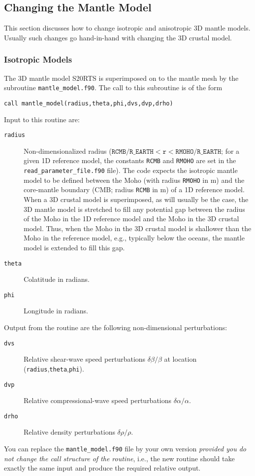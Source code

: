 \documentclass[onecolumn]{article}
\begin{document}
\subsection{Changing the Mantle Model}

This section discusses how to change isotropic and anisotropic
3D mantle models. Usually such changes go hand-in-hand with
changing the 3D crustal model.

\subsubsection{Isotropic Models}

The 3D mantle model S20RTS \cite{RiVaWo99} is superimposed on to
the mantle mesh by the subroutine \texttt{mantle\_model.f90}.
The call to this subroutine is of the form
\begin{verbatim}
call mantle_model(radius,theta,phi,dvs,dvp,drho)
\end{verbatim}
Input to this routine are:
\begin{description}
\item[\texttt{radius}] Non-dimensionalized radius
($\texttt{RCMB/R\_EARTH}<\texttt{r}<\texttt{RMOHO/R\_EARTH}$;
for a given 1D reference model,
the constants \texttt{RCMB} and \texttt{RMOHO} are set in the
\texttt{read\_parameter\_file.f90} file).
The code expects the isotropic mantle model to be defined between the Moho
(with radius \texttt{RMOHO} in m) and the core-mantle boundary (CMB;
radius \texttt{RCMB} in m) of a 1D reference model.
When a 3D crustal model is superimposed, as will usually
be the case, the 3D mantle model is stretched to fill any potential
gap between the radius of the Moho in the 1D reference model
and the Moho in the 3D crustal model.
Thus, when the Moho in the 3D crustal model is shallower than the Moho in
the reference model, e.g., typically below the oceans,
the mantle model is extended to fill this gap.
\item[\texttt{theta}] Colatitude in radians.
\item[\texttt{phi}] Longitude in radians.
\end{description}
Output from the routine are the following non-dimensional perturbations:
\begin{description}
\item[\texttt{dvs}] Relative shear-wave speed perturbations $\delta\beta/\beta$
at location (\texttt{radius},\texttt{theta},\texttt{phi}).
\item[\texttt{dvp}] Relative compressional-wave speed perturbations $\delta\alpha/\alpha$.
\item[\texttt{drho}] Relative density perturbations $\delta\rho/\rho$.
\end{description}
You can replace the \texttt{mantle\_model.f90} file by your own version
\textit{provided you do not change the call structure of the routine},
i.e., the new routine should take exactly the same input and
produce the required relative output.
\end{document}
